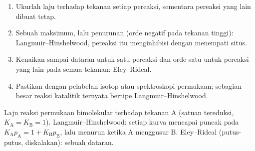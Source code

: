 \begin{method}\label{met:b3:surfaces-catalysis:mechanism-from-rate}
\begin{enumerate}
  \item Ukurlah laju terhadap tekanan setiap pereaksi, sementara pereaksi yang
        lain dibuat tetap.
  \item Sebuah maksimum, lalu penurunan (orde negatif pada tekanan tinggi):
        Langmuir--Hinshelwood, pereaksi itu menginhibisi dengan menempati situs.
  \item Kenaikan sampai dataran untuk satu pereaksi dan orde satu untuk pereaksi
        yang lain pada semua tekanan: Eley--Rideal.
  \item Pastikan dengan pelabelan isotop atau spektroskopi permukaan; sebagian
        besar reaksi katalitik ternyata bertipe Langmuir--Hinshelwood.
\end{enumerate}
\end{method}

\begin{omfigure}

{\small Laju reaksi permukaan bimolekular terhadap tekanan A
(satuan tereduksi, $K_{\mathrm A} = K_{\mathrm B} = 1$). Langmuir--Hinshelwood: setiap kurva mencapai puncak pada $K_{\mathrm A}p_{\mathrm A} =
1 + K_{\mathrm B}p_{\mathrm B}$, lalu menurun ketika A menggusur B. Eley--Rideal (putus-putus, diskalakan): sebuah dataran.}
\end{omfigure}

